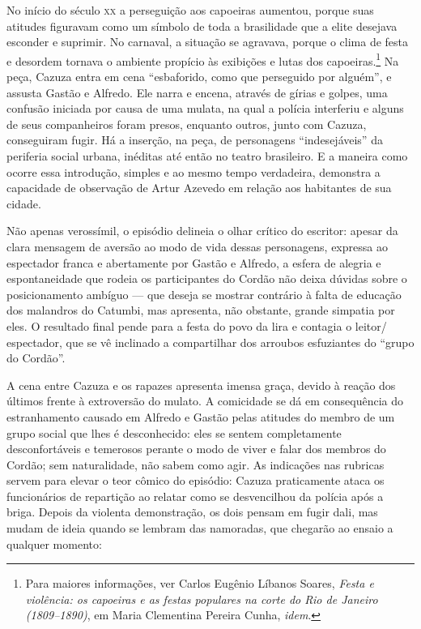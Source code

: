 No início do século \textsc{xx} a perseguição aos capoeiras\label{capoeira} aumentou, porque suas
atitudes figuravam como um símbolo de toda a brasilidade que a elite
desejava esconder e suprimir. No carnaval, a situação se agravava,
porque o clima de festa e desordem tornava o ambiente propício às
exibições e lutas dos capoeiras.\footnote{ Para maiores informações, ver Carlos Eugênio Líbanos Soares, \textit{Festa e
violência: os capoeiras e as festas populares na corte do Rio de
Janeiro (1809--1890)}, em Maria Clementina Pereira Cunha,
\textit{idem}.} Na peça, Cazuza entra em cena
“esbaforido, como que perseguido por alguém”, e assusta Gastão e
Alfredo. Ele narra e encena, através de gírias e golpes, uma confusão
iniciada por causa de uma mulata, na qual a polícia interferiu e alguns
de seus companheiros foram presos, enquanto outros, junto com Cazuza,
conseguiram fugir. Há a inserção, na peça, de personagens
“indesejáveis” da periferia social urbana, inéditas até então no teatro
brasileiro. E a maneira como ocorre essa introdução, simples e ao mesmo
tempo verdadeira, demonstra a capacidade de observação de Artur Azevedo
em relação aos habitantes de sua cidade.

Não apenas verossímil, o episódio delineia o olhar crítico do escritor:
apesar da clara mensagem de aversão ao modo de vida dessas personagens,
expressa ao espectador franca e abertamente por Gastão e Alfredo, a
esfera de alegria e espontaneidade que rodeia os participantes do
Cordão não deixa dúvidas sobre o posicionamento ambíguo --- que deseja se
mostrar contrário à falta de educação dos malandros do Catumbi, mas
apresenta, não obstante, grande simpatia por eles. O resultado final
pende para a festa do povo da lira e contagia o leitor/\,espectador, que
se vê inclinado a compartilhar dos arroubos esfuziantes do “grupo do
Cordão”.

A cena entre Cazuza e os rapazes apresenta imensa graça, devido à reação
dos últimos frente à extroversão do mulato. A comicidade se dá em
consequência do estranhamento causado em Alfredo e Gastão pelas
atitudes do membro de um grupo social que lhes é desconhecido: eles se
sentem completamente desconfortáveis e temerosos perante o modo de
viver e falar dos membros do Cordão; sem naturalidade, não sabem como
agir. As indicações nas rubricas servem para elevar o teor cômico do
episódio: Cazuza praticamente ataca os funcionários de repartição ao
relatar como se desvencilhou da polícia após a briga. Depois da
violenta demonstração, os dois pensam em fugir dali, mas mudam de ideia
quando se lembram das namoradas, que chegarão ao ensaio a qualquer
momento:
\medskip

